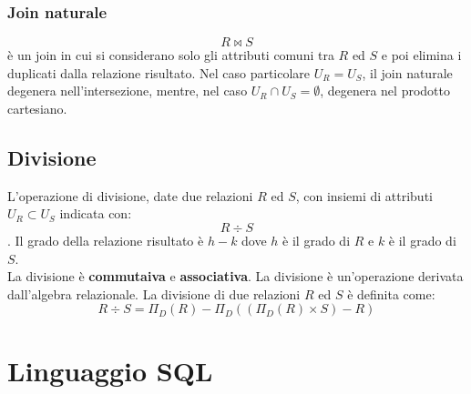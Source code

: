 \documentclass[12pt, a4paper]{report}
\begin{document}
    \subsection{Join naturale}
    \begin{equation*}
        R \bowtie S
    \end{equation*}
    è un join in cui si considerano solo gli attributi comuni tra $R$ ed $S$ e poi elimina i duplicati dalla relazione risultato. Nel caso particolare $U_{R}=U_{S}$, il join naturale degenera nell'intersezione, mentre, nel caso $U_{R}\cap U_{S}=\emptyset$, degenera nel prodotto cartesiano.
    \section{Divisione}
    L'operazione di divisione, date due relazioni $R$ ed $S$, con insiemi di attributi $U_{R}\subset U_{S}$ indicata con:
    \begin{equation*}
        R \div S
    \end{equation*}
    . Il grado della relazione risultato è $h-k$ dove $h$ è il grado di $R$ e $k$ è il grado di $S$.\\
    La divisione è \textbf{commutaiva} e \textbf{associativa}.
    La divisione è un'operazione derivata dall'algebra relazionale. La divisione di due relazioni $R$ ed $S$ è definita come:
    \begin{equation*}
        R \div S = \Pi_{D}(R) - \Pi_{D}((\Pi_{D}(R)\times S)-R)
    \end{equation*}
    \chapter{Linguaggio SQL}
\end{document}
